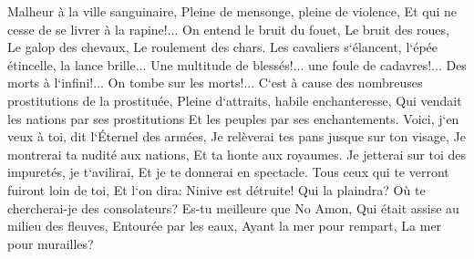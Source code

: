 \verse Malheur à la ville sanguinaire, Pleine de mensonge, pleine de violence, Et qui ne cesse de se livrer à la rapine!... 
\verse On entend le bruit du fouet, Le bruit des roues, Le galop des chevaux, Le roulement des chars. 
\verse Les cavaliers s`élancent, l`épée étincelle, la lance brille... Une multitude de blessés!... une foule de cadavres!... Des morts à l`infini!... On tombe sur les morts!... 
\verse C`est à cause des nombreuses prostitutions de la prostituée, Pleine d`attraits, habile enchanteresse, Qui vendait les nations par ses prostitutions Et les peuples par ses enchantements. 
\verse Voici, j`en veux à toi, dit l`Éternel des armées, Je relèverai tes pans jusque sur ton visage, Je montrerai ta nudité aux nations, Et ta honte aux royaumes. 
\verse Je jetterai sur toi des impuretés, je t`avilirai, Et je te donnerai en spectacle. 
\verse Tous ceux qui te verront fuiront loin de toi, Et l`on dira: Ninive est détruite! Qui la plaindra? Où te chercherai-je des consolateurs? 
\verse Es-tu meilleure que No Amon, Qui était assise au milieu des fleuves, Entourée par les eaux, Ayant la mer pour rempart, La mer pour murailles? 
